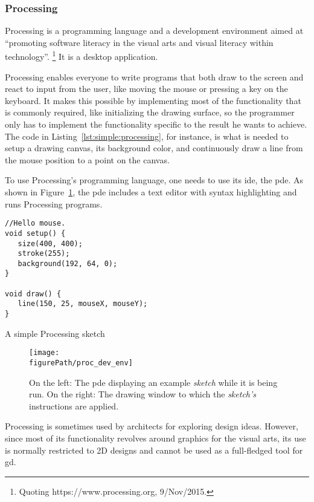 \subsubsection{Processing}
\label{section:processing:related}
Processing\cite{reas2007processing} is a programming language and a development environment aimed at ``promoting software literacy in the visual arts and visual literacy within technology''.%
\footnote{Quoting https://www.processing.org, 9/Nov/2015.}
It is a desktop application.

Processing enables everyone to write programs that both draw to the screen and react to input from the user, like moving the mouse or pressing a key on the keyboard.
It makes this possible by implementing most of the functionality that is commonly required, like initializing the drawing surface, so the programmer only has to implement the functionality specific to the result he wants to achieve.
The code in Listing~\ref{lst:simple:processing}, for instance, is what is needed to setup a drawing canvas, its background color, and continuously draw a line from the mouse position to a point on the canvas.

To use Processing's programming language, one needs to use its \gls{ide}, the \acrfull{pde}.
As shown in Figure~\ref{fig:proc:dev:env}, the \gls{pde} includes a text editor with syntax highlighting and runs Processing programs.

\begin{listing}
\begin{verbatim}
//Hello mouse.
void setup() {
   size(400, 400);
   stroke(255);
   background(192, 64, 0);
}

void draw() {
   line(150, 25, mouseX, mouseY);
}
\end{verbatim}
	\caption[A simple Processing sketch]{A simple Processing sketch}
	\label{lst:simple:processing}
\end{listing}

\begin{figure}
	\centering
	\texttt{[image: \\figurePath/proc\_dev\_env]}
	\caption{On the left: The \gls{pde} displaying an example \emph{sketch} while it is being run. On the right: The drawing window to which the \emph{sketch's} instructions are applied.}
	\label{fig:proc:dev:env}
\end{figure}

Processing is sometimes used by architects for exploring design ideas.
However, since most of its functionality revolves around graphics for the visual arts, its use is normally restricted to 2D designs and cannot be used as a full-fledged tool for \gls{gd}.

